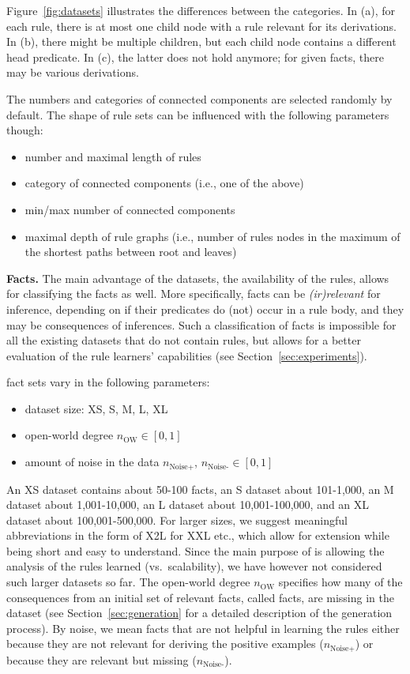 \documentclass[letterpaper]{article} \usepackage{aaai20}  \usepackage{times}  \usepackage{helvet} \usepackage{courier}  \usepackage[hyphens]{url}  \usepackage{graphicx} \urlstyle{rm} \def\UrlFont{\rm}  \usepackage{graphicx}  \frenchspacing  \setlength{\pdfpagewidth}{8.5in}  \setlength{\pdfpageheight}{11in}  \usepackage{amsthm}
\theoremstyle{definition}
\newcommand{\support}{\text{support}\xspace}
\newcommand{\tool}{\text{RuDaS}\xspace}
\newcommand{\nowa}{\ensuremath{n_{\text{OW}}}\xspace}
\newcommand{\nnoiseadd}{\ensuremath{n_{\text{Noise+}}}\xspace}
\newcommand{\nnoisemiss}{\ensuremath{n_{\text{Noise-}}}\xspace}
\begin{document}
Figure~\ref{fig:datasets} illustrates the differences between the categories. In (a), for each rule, there is at most one child node with a rule relevant for its derivations.
In (b), there might be multiple children, but each child node contains a different head predicate. In (c), the latter does not hold anymore; for given facts, there may be various derivations. 

The numbers and categories of connected components are selected randomly by default.
The shape of \tool rule sets can be influenced with the following parameters though: 

\begin{itemize}
\item number and maximal length of rules
\item category of connected components (i.e., one of the above)\item min/max number of connected components
\item maximal depth of rule graphs (i.e., number of rules nodes in the maximum of the shortest paths between root and leaves)
\end{itemize}

\textbf{Facts.} 
The main advantage of the \tool datasets, the availability of the rules, allows for classifying the facts as well. More specifically, facts can be \emph{(ir)relevant} for inference, depending on if their predicates do (not) occur in a rule body, and they may be consequences of inferences.
Such a classification of facts is impossible for all the existing datasets that do not contain rules, but allows for a better evaluation of the rule learners' capabilities (see Section~\ref{sec:experiments}).  

\tool fact sets vary in the following parameters:
\begin{itemize}
\item dataset size: XS, S, M, L, XL
\item open-world degree \nowa $\in [0,1]$ \item amount of noise in the data \nnoiseadd, \nnoisemiss $\in [0,1]$ \end{itemize}
An XS dataset contains about 50-100 facts, 
an S dataset about 101-1,000, 
an M dataset about 1,001-10,000,
an L dataset about 10,001-100,000,
and an XL dataset about 100,001-500,000. For larger sizes, we suggest meaningful abbreviations in the form of X2L for XXL etc., which allow for extension while being short and easy to understand.
Since the main purpose of \tool is allowing the analysis of the rules learned (vs.\ scalability), we have however not considered such larger datasets so far. The open-world degree \nowa specifies how many of the consequences from an initial set of relevant facts, called \emph{\support} facts, are missing in the dataset (see Section~\ref{sec:generation} for a detailed description of the generation process).
By noise, we mean facts that are not helpful in learning the rules either because they are not relevant for deriving the positive examples (\nnoiseadd) or because they are relevant but missing (\nnoisemiss).
\end{document}
